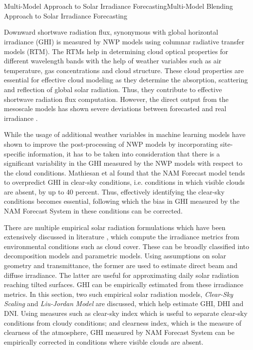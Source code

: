 \chapter{}{{Multi-Model Approach to Solar Irradiance Forecasting}}{Multi-Model Blending Approach to Solar Irradiance Forecasting}

\par Downward shortwave radiation flux, synonymous with global horizontal irradiance (GHI) is measured by NWP models using columnar radiative transfer models (RTM). The RTMs help in determining cloud optical properties for different wavelength bands with the help of weather variables such as air temperature, gas concentrations and cloud structure. These cloud properties are essential for effective cloud modeling as they determine the absorption, scattering and reflection of global solar radiation. Thus, they contribute to effective shortwave radiation flux computation. However, the direct output from the mesoscale models has shown severe deviations between forecasted and real irradiance \cite{multimodel_ghi}. 

\par While the usage of additional weather variables in machine learning models have shown to improve the post-processing of NWP models by incorporating site-specific information, it has to be taken into consideration that there is a significant variability in the GHI measured by the NWP models with respect to the cloud conditions. Mathiesan et al \cite{multimodel_overpredict} found that the NAM Forecast model tends to overpredict GHI in clear-sky conditions, i.e. conditions in which visible clouds are absent, by up to 40 percent. Thus, effectively identifying the clear-sky conditions becomes essential, following which the bias in GHI measured by the NAM Forecast System in these conditions can be corrected.

\par There are multiple empirical solar radiation formulations which have been extensively discussed in literature \cite{litrev_pvlib10}\cite{litrev_pvlib11}\cite{litrev_pvlib12}\cite{litrev_pvlib13}\cite{litrev_pvlib14}\cite{litrev_pvlib9}, which compute the irradiance metrics from environmental conditions such as cloud cover. These can be broadly classified into decomposition models and parametric models. Using assumptions on solar geometry and transmittance, the former are used to estimate direct beam and diffuse irradiance. The latter are useful for approximating daily solar radiation reaching tilted surfaces. GHI can be empirically estimated from these irradiance metrics. In this \restoregeometry\noindent section, two such empirical solar radiation models, \textit{Clear-Sky Scaling} and \textit{Liu-Jordan Model} are discussed, which help estimate GHI, DHI and DNI. Using measures such as clear-sky index which is useful to separate clear-sky conditions from cloudy conditions; and clearness index, which is the measure of clearness of the atmosphere, GHI measured by NAM Forecast System can be empirically corrected in conditions where visible clouds are absent.


